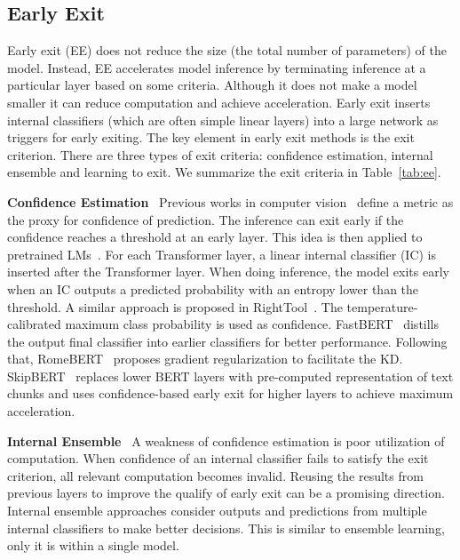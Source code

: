 \documentclass[letterpaper]{article}
\newcommand{\paratitle}[1]{\noindent\textbf{#1}\ }
\begin{document}
\subsection{Early Exit}
\label{sec:ee}
Early exit (EE) does not reduce the size (the total number of parameters) of the model. Instead, EE accelerates model inference by terminating inference at a particular layer based on some criteria. Although it does not make a model smaller it can reduce computation and achieve acceleration.
Early exit inserts internal classifiers (which are often simple linear layers) into a large network as triggers for early exiting. The key element in early exit methods is the exit criterion. There are three types of exit criteria: confidence estimation, internal ensemble and learning to exit. We summarize the exit criteria in Table~\ref{tab:ee}.

\paratitle{Confidence Estimation} Previous works in computer vision~\citep{park2015big,branchynet,shallowdeep} define a metric as the proxy for confidence of prediction. The inference can exit early if the confidence reaches a threshold at an early layer. This idea is then applied to pretrained LMs~\citep{deebert}. For each Transformer layer, a linear internal classifier (IC) is inserted after the Transformer layer. When doing inference, the model exits early when an IC outputs a predicted probability with an entropy lower than the threshold. A similar approach is proposed in RightTool~\citep{schwartz2020right}. The temperature-calibrated maximum class probability is used as confidence. FastBERT~\citep{fastbert} distills the output final classifier into earlier classifiers for better performance. Following that, RomeBERT~\citep{geng2021romebert} proposes gradient regularization to facilitate the KD. SkipBERT~\citep{skipbert} replaces lower BERT layers with pre-computed representation of text chunks and uses confidence-based early exit for higher layers to achieve maximum acceleration.


\paratitle{Internal Ensemble}
A weakness of confidence estimation is poor utilization of computation. When confidence of an internal classifier fails to satisfy the exit criterion, all relevant computation becomes invalid. Reusing the results from previous layers to improve the qualify of early exit can be a promising direction. Internal ensemble approaches consider outputs and predictions from multiple internal classifiers to make better decisions. This is similar to ensemble learning, only it is within a single model.
\end{document}
